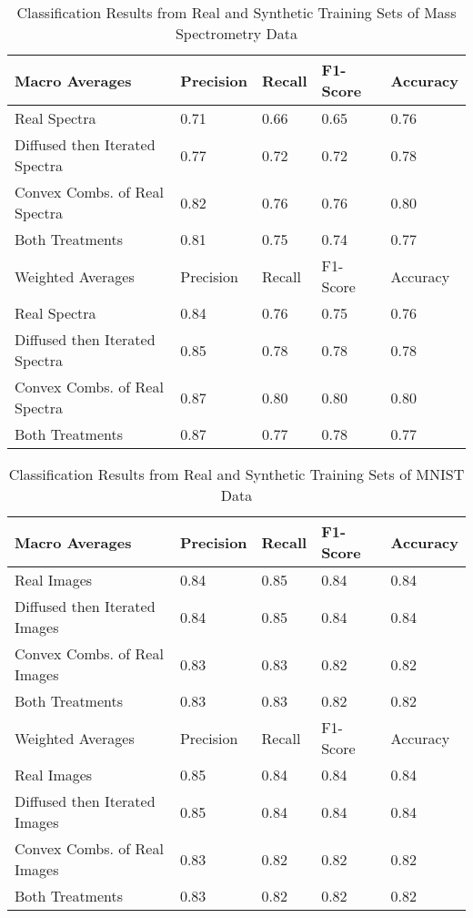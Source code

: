 \documentclass[sigconf]{acmart}
\begin{document}
\begin{table*}
  \caption{Classification Results from Real and Synthetic Training Sets of Mass Spectrometry Data}
  \label{tab:commands}
  \begin{tabular}{l|l|l|l|l}
    \toprule
    Macro Averages & Precision & Recall & F1-Score & Accuracy\\
    \midrule
    Real Spectra & 0.71 & 0.66 & 0.65 & 0.76 \\
    Diffused then Iterated Spectra & 0.77 & 0.72 & 0.72 & 0.78 \\
    Convex Combs. of Real Spectra & 0.82 & 0.76 & 0.76 & 0.80 \\
    Both Treatments & 0.81 & 0.75 & 0.74 & 0.77 \\
    \midrule
    Weighted Averages & Precision & Recall & F1-Score & Accuracy\\
    \midrule
    Real Spectra & 0.84 & 0.76 & 0.75 & 0.76 \\
    Diffused then Iterated Spectra & 0.85 & 0.78 & 0.78 & 0.78 \\
    Convex Combs. of Real Spectra & 0.87 & 0.80 & 0.80 & 0.80 \\
    Both Treatments & 0.87 & 0.77 & 0.78 & 0.77 \\
    \bottomrule
  \end{tabular}
\end{table*}

\begin{table*}
  \caption{Classification Results from Real and Synthetic Training Sets of MNIST Data}
  \label{tab:commands}
  \begin{tabular}{l|l|l|l|l}
    \toprule
    Macro Averages & Precision & Recall & F1-Score & Accuracy\\
    \midrule
    Real Images & 0.84 & 0.85 & 0.84 & 0.84 \\
    Diffused then Iterated Images & 0.84 & 0.85 & 0.84 & 0.84 \\
    Convex Combs. of Real Images & 0.83 & 0.83 & 0.82 & 0.82 \\
    Both Treatments & 0.83 & 0.83 & 0.82 & 0.82 \\
    \midrule
    Weighted Averages & Precision & Recall & F1-Score & Accuracy\\
    \midrule
    Real Images & 0.85 & 0.84 & 0.84 & 0.84 \\
    Diffused then Iterated Images & 0.85 & 0.84 & 0.84 & 0.84 \\
    Convex Combs. of Real Images & 0.83 & 0.82 & 0.82 & 0.82 \\
    Both Treatments & 0.83 & 0.82 & 0.82 & 0.82 \\
    \bottomrule
  \end{tabular}
\end{table*}
\end{document}
